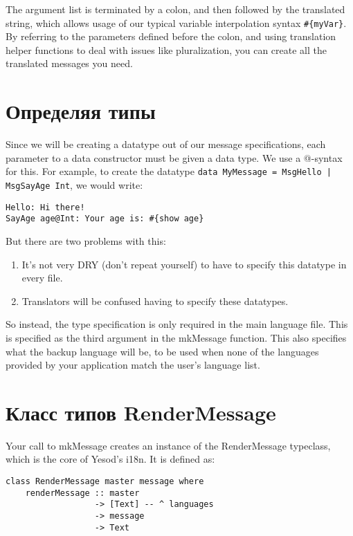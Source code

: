 The argument list is terminated by a colon, and then followed by the translated string, which allows usage of our typical variable interpolation syntax \lstinline'#{myVar}'. By referring to the parameters defined before the colon, and using translation helper functions to deal with issues like pluralization, you can create all the translated messages you need.

\section{Определяя типы} %

Since we will be creating a datatype out of our message specifications, each parameter to a data constructor must be given a data type. We use a @-syntax for this. For example, to create the datatype \lstinline'data MyMessage = MsgHello | MsgSayAge Int', we would write:

\begin{lstlisting}
Hello: Hi there!
SayAge age@Int: Your age is: #{show age}
\end{lstlisting}

But there are two problems with this:

\begin{enumerate}
  \item It's not very DRY (don't repeat yourself) to have to specify this datatype in every file.
  \item Translators will be confused having to specify these datatypes.
\end{enumerate}

So instead, the type specification is only required in the main language file. This is specified as the third argument in the mkMessage function. This also specifies what the backup language will be, to be used when none of the languages provided by your application match the user's language list.

\section{Класс типов RenderMessage} %

Your call to mkMessage creates an instance of the RenderMessage typeclass, which is the core of Yesod's i18n. It is defined as:
\begin{lstlisting}
class RenderMessage master message where
    renderMessage :: master
                  -> [Text] -- ^ languages
                  -> message
                  -> Text 
\end{lstlisting}

